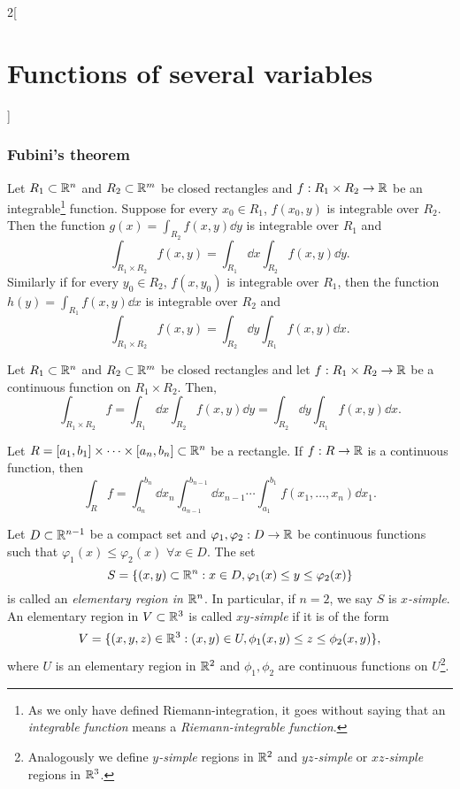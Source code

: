 \documentclass[../../../main.tex]{subfiles}
\begin{document}
\begin{multicols}{2}[\section{Functions of several variables}]
\subsubsection*{Fubini's theorem}
\begin{theorem}
Let $R_1\subset\mathbb{R}^n$ and $R_2\subset\mathbb{R}^m$ be closed rectangles and $f:R_1\times R_2\rightarrow\mathbb{R} $ be an integrable\footnote{As we only have defined Riemann-integration, it goes without saying that an \textit{integrable function} means a \textit{Riemann-integrable function}.} function. Suppose for every $x_0\in R_1$, $f(x_0,y)$ is integrable over $R_2$. Then the function $\displaystyle g(x)=\int_{R_2}f(x,y)\dd y$ is integrable over $R_1$ and $$\int_{R_1\times R_2}f(x,y)=\int_{R_1}\dd x\int_{R_2}f(x,y)\dd y.$$ Similarly if for every $y_0\in R_2$, $f(x,y_0)$ is integrable over $R_1$, then the function $\displaystyle h(y)=\int_{R_1}f(x,y)\dd x$ is integrable over $R_2$ and $$\int_{R_1\times R_2}f(x,y)=\int_{R_2}\dd y\int_{R_1}f(x,y)\dd x.$$
\begin{corollary}
Let $R_1\subset\mathbb{R}^n$ and $R_2\subset\mathbb{R}^m$ be closed rectangles and let $f:R_1\times R_2\rightarrow\mathbb{R} $ be a continuous function on $R_1\times R_2$. Then, $$\int_{R_1\times R_2}f=\int_{R_1}\dd x\int_{R_2}f(x,y)\dd y=\int_{R_2}\dd y\int_{R_1}f(x,y)\dd x.$$
\end{corollary}
\begin{corollary}
Let $R=[a_1,b_1]\times\cdots\times[a_n,b_n]\subset\mathbb{R}^n$ be a rectangle. If $f:R\rightarrow\mathbb{R} $ is a continuous function, then $$\int_Rf=\int_{a_n}^{b_n}\dd x_n\int_{a_{n-1}}^{b_{n-1}}\dd x_{n-1}\cdots\int_{a_1}^{b_1}f(x_1,\ldots,x_n)\dd x_1.$$
\end{corollary}
\begin{definition}
Let $D\subset\mathbb{R}^{n-1}$ be a compact set and $\varphi_1,\varphi_2:D\rightarrow\mathbb{R} $ be continuous functions such that $\varphi_1(x)\leq\varphi_2(x)$ $\forall x\in D$. The set $$S=\{(x,y)\subset\mathbb{R}^n:x\in D, \varphi_1(x)\leq y\leq\varphi_2(x)\}$$ is called an \textit{elementary region in $\mathbb{R}^n$}. In particular, if $n=2$, we say $S$ is \textit{$x$-simple}. An elementary region in $V\subset\mathbb{R}^3$ is called \textit{$xy$-simple} if it is of the form $$V=\{(x,y,z)\in\mathbb{R}^3:(x,y)\in U, \phi_1(x,y)\leq z\leq\phi_2(x,y)\},$$ where $U$ is an elementary region in $\mathbb{R}^2$ and $\phi_1,\phi_2$ are continuous functions on $U$\footnote{Analogously we define \textit{$y$-simple} regions in $\mathbb{R}^2$ and \textit{$yz$-simple} or \textit{$xz$-simple} regions in $\mathbb{R}^3$.}.
\end{definition}

\end{theorem}
\end{multicols}
\end{document}
